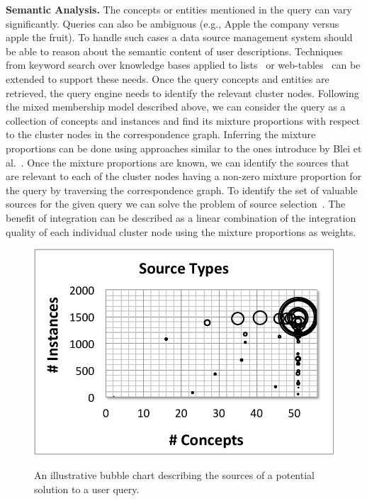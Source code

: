 \documentclass{sig-alternate}
\begin{document}
\vspace{3pt}\noindent\textbf{Semantic Analysis.} The concepts or entities mentioned in the query can vary significantly. Queries can also be ambiguous (e.g., Apple the company versus apple the fruit). To handle such cases a data source management system should be able to reason about the semantic content of user descriptions. Techniques from keyword search over knowledge bases applied to lists~\cite{pimplikar:2012} or web-tables~\cite{dassarma:2012} can be extended to support these needs. Once the query concepts and entities are retrieved, the query engine needs to identify the relevant cluster nodes. Following the mixed membership model described above, we can consider the query as a collection of concepts and instances and find its mixture proportions with respect to the cluster nodes in the correspondence graph. Inferring the mixture proportions can be done using approaches similar to the ones introduce by Blei et al.~\cite{blei:2003}. Once the mixture proportions are known, we can identify the sources that are relevant to each of the cluster nodes having a non-zero mixture proportion for the query by traversing the correspondence graph. To identify the set of valuable sources for the given query we can solve the problem of source selection~\cite{dong:vldb13, rekatsinas:2014}. The benefit of integration can be described as a linear combination of the integration quality of each individual cluster node using the mixture proportions as weights.
\begin{figure}
	\begin{center}
	\includegraphics[clip,scale=0.35]{fig/sources.pdf}
	\caption{An illustrative bubble chart describing the sources of a potential solution to a user query.}
	\vspace{-5pt}
	\label{fig:bubble}
	\end{center}
	\vspace{-20pt}
\end{figure}
\end{document}
